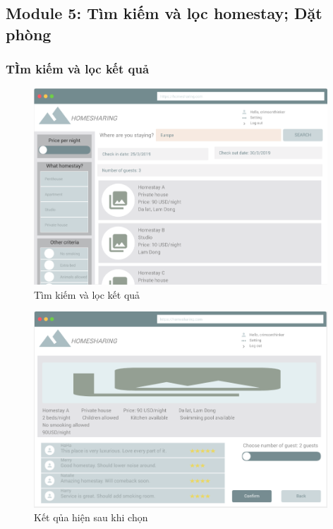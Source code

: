\newpage
\subsection{Module 5: Tìm kiếm và lọc homestay; Dặt phòng}
\subsubsection{TÌm kiếm và lọc kết quả}
\begin{figure}[H]
	\centering
	\includegraphics[width=11cm]{parts/Khoa/khoa_ui/1.png}
	\vspace{0.5cm}
	\caption{Tìm kiếm và lọc kết quả}
\end{figure}
\begin{figure}[H]
	\centering
	\includegraphics[width=11cm]{parts/Khoa/khoa_ui/1b.png}
	\vspace{0.5cm}
	\caption{Kết qủa hiện sau khi chọn}
\end{figure}
\newpage
